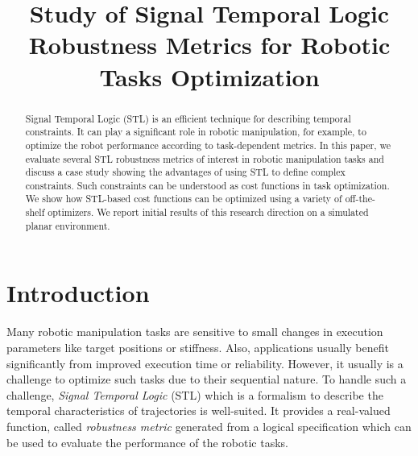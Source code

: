 \documentclass[conference]{IEEEtran}
\begin{document}
\title{Study of Signal Temporal Logic Robustness Metrics for Robotic Tasks Optimization
}

\author{
}

\maketitle

\begin{abstract}
Signal Temporal Logic (STL) is an efficient technique for describing temporal constraints.
It can play a significant role in robotic manipulation, for example, to optimize the robot performance according to task-dependent metrics.
In this paper, we evaluate several STL robustness metrics of interest in robotic manipulation tasks and discuss a case study showing the advantages of using STL to define complex constraints.
Such constraints can be understood as cost functions in task optimization. 
We show how STL-based cost functions can be optimized using a variety of off-the-shelf optimizers.
We report initial results of this research direction on a simulated planar environment. 
\end{abstract}

\section{Introduction}
Many robotic manipulation tasks are sensitive to small changes in execution parameters like target positions or stiffness.
Also, applications usually benefit significantly from improved execution time or reliability.
However, it usually is a challenge to optimize such tasks due to their sequential nature.
To handle such a challenge, \emph{Signal Temporal Logic} (STL) which is a formalism to describe the temporal characteristics of trajectories is well-suited.
It provides a real-valued function, called \emph{robustness metric} generated from a logical specification which can be used to evaluate the performance of the robotic tasks.
\end{document}
